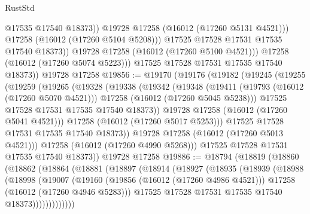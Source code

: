 \begin{lexlean}{RustStd}
\begin{coremodule}
                        @17535
                        @17540
                        @18373))
                    @19728
                    @17258
                    (@16012 (@17260 @5131 @4521)))
                  @17258
                  (@16012 (@17260 @5104 @5208)))
                @17525
                @17528
                @17531
                @17535
                @17540
                @18373))
            @19728
            @17258
            (@16012 (@17260 @5100 @4521)))
          @17258
          (@16012 (@17260 @5074 @5223)))
        @17525
        @17528
        @17531
        @17535
        @17540
        @18373))
    @19728
    @17258
@19856 := @19170
    (@19176
      (@19182
        (@19245
          (@19255
            (@19259
              (@19265
                (@19328
                  (@19338
                    (@19342
                      (@19348
                        (@19411
                          (@19793 (@16012 (@17260 @5070 @4521)))
                          @17258
                          (@16012 (@17260 @5045 @5238)))
                        @17525
                        @17528
                        @17531
                        @17535
                        @17540
                        @18373))
                    @19728
                    @17258
                    (@16012 (@17260 @5041 @4521)))
                  @17258
                  (@16012 (@17260 @5017 @5253)))
                @17525
                @17528
                @17531
                @17535
                @17540
                @18373))
            @19728
            @17258
            (@16012 (@17260 @5013 @4521)))
          @17258
          (@16012 (@17260 @4990 @5268)))
        @17525
        @17528
        @17531
        @17535
        @17540
        @18373))
    @19728
    @17258
@19886 := @18794
    (@18819
      (@18860
        (@18862
          (@18864
            (@18881
              (@18897
                (@18914
                  (@18927
                    (@18935
                      (@18939
                        (@18988
                          (@18998
                            (@19007
                              (@19160
                                (@19856 (@16012 (@17260 @4986 @4521)))
                                @17258
                                (@16012 (@17260 @4946 @5283)))
                              @17525
                              @17528
                              @17531
                              @17535
                              @17540
                              @18373)))))))))))))

\end{coremodule}
\end{lexlean}
